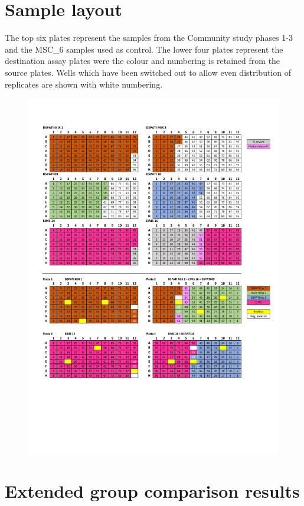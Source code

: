 \documentclass{article}
\begin{document}
\section{Sample layout}\label{sample_layout}
The top six plates represent the samples from the Community study phases 1-3 and the MSC\_6 samples used as control. The lower four plates represent the destination assay plates were the colour and numbering is retained from the source plates. Wells which have been switched out to allow even distribution of replicates are shown with white numbering.
\begin{figure}[H]
	\centering
	\includegraphics[clip, trim=0.5cm 5cm 0.5cm 2cm, width=\linewidth]{pages/AK prov layout.pdf}
\end{figure}

\newpage
\section{Extended group comparison results}\label{full_group_res}
\end{document}
